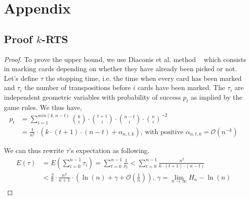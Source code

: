 \documentclass{llncs}
\begin{document}
\pagebreak
\section{Appendix}
\subsection{Proof $k$-RTS}\label{proof:kRTS}
\begin{proof}
To prove the upper bound, we use Diaconis et al. method ~\cite{aldous1986shuffling} which consists in marking cards depending on whether they have already been picked or not. Let's define $\tau$ the stopping time, i.e. the time when every card has been marked and $\tau_i$ the number of transpositions before $i$ cards have been marked. The $\tau_i$ are independent geometric variables with probability of success $p_t$ as implied by the game rules.
We thus have,
\begin{align*}
 p_t &= \sum_{i=1}^{min(k,n-t)} {k \choose i} \cdot {t+1 \choose i} \cdot {n-t \choose i}\cdot{n \choose i}^{-2}&\\
 &= \frac{1}{n^2} \cdot \left ( k \cdot (t+1)\cdot(n-t) + \alpha_{n,t,k}\right ),\ \text{with positive } \alpha_{n,t,k} = \mathcal{O}\left(n^{-k}\right )
\end{align*}

We can thus rewrite $\tau$'s expectation as following.
\begin{align*}
 E(\tau) &=  E \left ( \sum_{i=0}^{n-1} \tau_i \right ) = \sum_{t=0}^{n-1} \frac{1}{p_{t}}  < \sum_{t=0}^{n-1} \frac{n^2}{k \cdot (t+1)\cdot(n-t)}&\\  
 &< \frac{2}{k} \cdot \frac{n^2}{n+1} \cdot \left( \ln(n) + \gamma +\mathcal{O}(\frac{1}{n}) \right),\ \gamma = \lim_{n \to \infty} H_n - \ln(n)& \\
 \end{align*}
 \end{proof}
 \vspace{-2.5em}
 
\end{document}
